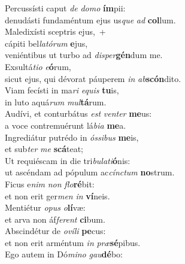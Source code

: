 \evenverse Percussísti caput \textit{de} \textit{do}\textit{mo} \textbf{ím}pii:~\*\\
\evenverse denudásti fundaméntum ejus us\textit{que} \textit{ad} \textbf{col}lum.\\
\oddverse Maledixísti sceptris ejus,~+\\
\oddverse  cápiti bel\textit{la}\textit{tó}\textit{rum} \textbf{e}jus,~\*\\
\oddverse veniéntibus ut turbo ad \textit{di}\textit{sper}\textbf{gén}dum me.\\
\evenverse Exsultá\textit{ti}\textit{o} \textit{e}\textbf{ó}rum,~\*\\
\evenverse sicut ejus, qui dévorat páuperem \textit{in} \textit{ab}\textbf{scón}dito.\\
\oddverse Viam fecísti in ma\textit{ri} \textit{e}\textit{quis} \textbf{tu}is,~\*\\
\oddverse in luto aquá\textit{rum} \textit{mul}\textbf{tá}rum.\\
\evenverse Audívi, et conturbátus \textit{est} \textit{ven}\textit{ter} \textbf{me}us:~\*\\
\evenverse a voce contremuérunt lá\textit{bi}\textit{a} \textbf{me}a.\\
\oddverse Ingrediátur putrédo in \textit{ós}\textit{si}\textit{bus} \textbf{me}is,~\*\\
\oddverse et sub\textit{ter} \textit{me} \textbf{scá}teat;\\
\evenverse Ut requiéscam in die tri\textit{bu}\textit{la}\textit{ti}\textbf{ó}nis:~\*\\
\evenverse ut ascéndam ad pópulum ac\textit{cín}\textit{ctum} \textbf{no}strum.\\
\oddverse Ficus e\textit{nim} \textit{non} \textit{flo}\textbf{ré}bit:~\*\\
\oddverse et non erit ger\textit{men} \textit{in} \textbf{ví}neis.\\
\evenverse Mentiétur \textit{o}\textit{pus} \textit{o}\textbf{lí}væ:~\*\\
\evenverse et arva non áf\textit{fe}\textit{rent} \textbf{ci}bum.\\
\oddverse Abscindétur de \textit{o}\textit{ví}\textit{li} \textbf{pe}cus:~\*\\
\oddverse et non erit arméntum \textit{in} \textit{præ}\textbf{sé}pibus.\\
\evenverse Ego autem in Dó\textit{mi}\textit{no} \textit{gau}\textbf{dé}bo:~\*\\
